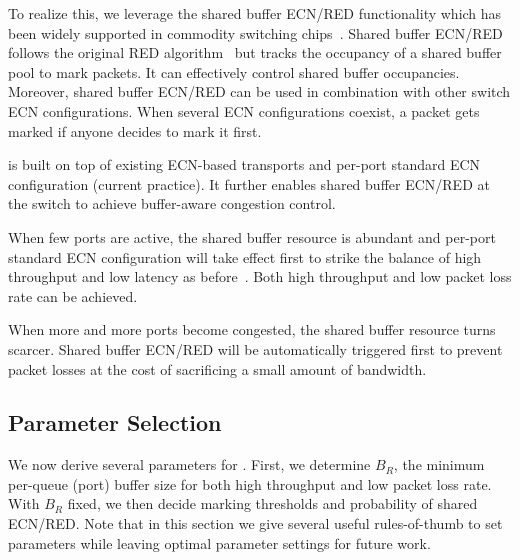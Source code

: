 To realize this, we leverage the shared buffer ECN/RED functionality which has been widely supported in commodity switching chips~\cite{arista_ecn,mqecn}. Shared buffer ECN/RED follows the original RED algorithm~\cite{RED} but tracks the occupancy of a shared buffer pool to mark packets. It can effectively control shared buffer occupancies. Moreover, shared buffer ECN/RED can be used in combination with other switch ECN configurations. When several ECN configurations coexist, a packet gets marked if anyone decides to mark it first.

\vspace{-1mm}
\sys is built on top of existing ECN-based transports and per-port standard ECN configuration (current practice). It further enables shared buffer ECN/RED at the switch to achieve buffer-aware congestion control.
\begin{icompact}
\item When few ports are active, the shared buffer resource is abundant and per-port standard ECN configuration will take effect first to strike the balance of high throughput and low latency as before~\cite{dctcp}. Both high throughput and low packet loss rate can be achieved.
\vspace{-1mm}
\item When more and more ports become congested, the shared buffer resource turns scarcer. Shared buffer ECN/RED will be automatically triggered first to prevent packet losses at the cost of sacrificing a small amount of bandwidth.
\vspace{-1mm}
\end{icompact}

\subsection{Parameter Selection}\label{subsec:parameter}
We now derive several parameters for \sys. First, we determine $B_R$, the minimum per-queue (port) buffer size for both high throughput and low packet loss rate. With $B_R$ fixed, we then decide marking thresholds and probability of shared ECN/RED. Note that in this section we give several useful rules-of-thumb to set parameters while leaving optimal parameter settings for future work.

